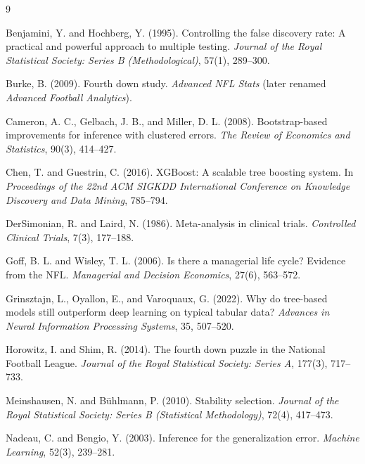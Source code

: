 \documentclass[USenglish]{article}
\theoremstyle{dgthm}
\theoremstyle{dgdef}
\begin{document}
\begin{thebibliography}{9}

Benjamini, Y. and Hochberg, Y. (1995). Controlling the false discovery rate: A practical and powerful approach to multiple testing. \emph{Journal of the Royal Statistical Society: Series B (Methodological)}, 57(1), 289--300.

Burke, B. (2009). Fourth down study. \emph{Advanced NFL Stats} (later renamed \emph{Advanced Football Analytics}).

Cameron, A. C., Gelbach, J. B., and Miller, D. L. (2008). Bootstrap-based improvements for inference with clustered errors. \emph{The Review of Economics and Statistics}, 90(3), 414--427.

Chen, T. and Guestrin, C. (2016). XGBoost: A scalable tree boosting system. In \emph{Proceedings of the 22nd ACM SIGKDD International Conference on Knowledge Discovery and Data Mining}, 785--794.

DerSimonian, R. and Laird, N. (1986). Meta-analysis in clinical trials. \emph{Controlled Clinical Trials}, 7(3), 177--188.

Goff, B. L. and Wisley, T. L. (2006). Is there a managerial life cycle? Evidence from the NFL. \emph{Managerial and Decision Economics}, 27(6), 563--572.

Grinsztajn, L., Oyallon, E., and Varoquaux, G. (2022). Why do tree-based models still outperform deep learning on typical tabular data? \emph{Advances in Neural Information Processing Systems}, 35, 507--520.

Horowitz, I. and Shim, R. (2014). The fourth down puzzle in the National Football League. \emph{Journal of the Royal Statistical Society: Series A}, 177(3), 717--733.

Meinshausen, N. and B\"uhlmann, P. (2010). Stability selection. \emph{Journal of the Royal Statistical Society: Series B (Statistical Methodology)}, 72(4), 417--473.

Nadeau, C. and Bengio, Y. (2003). Inference for the generalization error. \emph{Machine Learning}, 52(3), 239--281.


\end{thebibliography}
\end{document}
